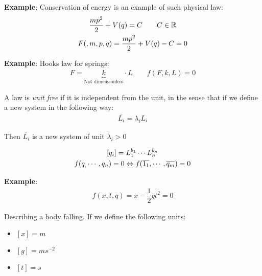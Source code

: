 \par\bigskip
\noindent\textbf{Example}:
\noindent Conservation of energy is an example of such physical law:
\begin{equation*}
  \begin{gathered}
    \dfrac{mp^2}{2}+V(q) = C\qquad C\in\mathbb{R}\\
    F(,m,p,q) = \dfrac{mp^2}{2}+V(q)-C = 0
  \end{gathered}
\end{equation*}
\par\bigskip
\noindent\textbf{Example}:
\noindent Hooks law for springs:
\begin{equation*}
  \begin{gathered}
    F = \underbrace{k}_{\text{Not dimensionless}}\cdot L\qquad f(F,k,L) = 0
  \end{gathered}
\end{equation*}
\par\bigskip
\begin{theo}{}
  A law is \textit{unit free} if it is independent from the unit, in the sense that if we define a new system in the following way:
  \begin{equation*}
    \begin{gathered}
      \overline{L_i} = \lambda_i L_i
    \end{gathered}
  \end{equation*}\par
  \noindent Then $\overline{L_i}$ is a new system of unit $\lambda_i>0$
  \par\bigskip
  \begin{equation*}
    \begin{gathered}
      [q_i] = L_1^{b_1}\cdots L_n^{b_n}\\
      f(q_,\cdots,q_n) = 0\Lrarr f(\overline{1_1},\cdots,\overline{q_m}) = 0
    \end{gathered}
  \end{equation*}
\end{theo}
\par\bigskip
\noindent\textbf{Example}:
\begin{equation*}
  \begin{gathered}
    f(x,t,q) = x-\dfrac{1}{2}gt^2 = 0
  \end{gathered}
\end{equation*}\par
\noindent Describing a body falling. If we define the following units:\par
\begin{itemize}
  \item $[x] = m$
  \item $[g] = ms^{-2}$
  \item$[t] = s$
\end{itemize}\par
